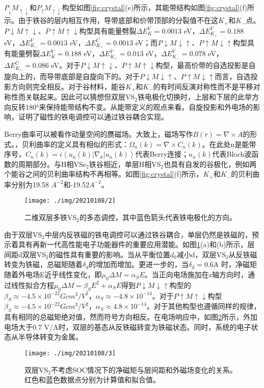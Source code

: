 \documentclass[reprint, aps, prb, showkeys]{revtex4-2}
\begin{document}
$P_{\downarrow}M_{\uparrow\downarrow}$和$P_{\uparrow}M_{\uparrow\downarrow}$构型如图\ref{fig:crystal}(e)所示，其能带结构如图\ref{fig:crystal}(f)所示。由于铁谷的层内相互作用，导带底部和价带顶部的分裂值不在这$K_{+}$和$K_{-}$点。$P{\downarrow}M{\uparrow\downarrow}$、$P{\uparrow}M{\uparrow\downarrow}$构型具有能量劈裂$\Delta E_{K}^{V} = 0.0013$ eV，$\Delta E_{K_{+}}^{V} = 0.188$ eV，$\Delta E_{K_{-}}^{V} = 0.0013$ eV，$\Delta E_{K_{+}}^{\overline{C} } = 0.0013$ eV；而$P{\downarrow}M{\downarrow\uparrow}$、$P{\uparrow}M{\downarrow\uparrow}$构型具有能量劈裂$\Delta E_{K}^{V} = 0.188$ eV，$\Delta E_{K_{+}}^{V} = 0.013$ eV，$\Delta E_{K_{-}}^{V} = 0.078$ eV，$\Delta E_{K_{+}}^{\overline{C} } = 0.086$ eV。对于$P{\downarrow}M{\uparrow\downarrow}$、$P{\uparrow}M{\uparrow\downarrow}$构型，最高价带的自选投影是自旋向上的，而导带底部是自旋向下的。对于$P{\downarrow}M{\downarrow\uparrow}$、$P{\uparrow}M{\downarrow\uparrow}$而言，自选投影方向则完全相反。对于谷材料，能谷$K_{+}$和$K_{-}$的有时间反演对称性而不是平移对称性而关联起来。因此可以猜想但双层VS$_2$铁电极化切换时，上层和下层的此举方向反转180°来保持能带结构不变。从能带定义的观点来看。自旋投影和外电场的影响，证明了磁性的铁电调控可以通过铁谷耦合实现。

Berry曲率可以被看作动量空间的赝磁场。大致上，磁场写作$B(r) = \nabla \times A$的形式。，贝利曲率的定义具有相似的形式：$\Omega_{n}(k) = \nabla \times C_n(k)$。在此处n是能带序号，$C_n(k) = i \left\langle u_n(k)| \nabla_k | u_n(k) \right\rangle $代表Berry连接；$u_n(k)$代表Bloch波函数的周期部分。与H相VSe$_2$铁谷相近，单层H相VS$_2$也具有自发的谷极化，例如两个能谷之间的贝利曲率结构不再相等。如图\ref{fig:crystal}(f)所示，$K_{+}$和$K_{-}$的贝利曲率分别为19.58 $A^{-2}$和-19.52$A^{-2}$。

\begin{figure}[t]
    \texttt{[image: ./img/20210108/2]}
    \caption{\label{fig:control} 
    二维双层多铁VS$_2$的多态调控，其中蓝色箭头代表铁电极化的方向。
    }
\end{figure}
由于双层VS$_2$中层内反铁磁的铁电调控可以通过铁谷耦合，单层仍然是铁磁的，预示着具有再新一代高性能电子功能器件的重要应用潜能。如图\ref{fig:control}(a)和(b)所示，层间距d双层VS$_2$的磁性具有重要的影响。当从平衡位置$d_0$减小d，双层VS$_2$从反铁磁转变为铁磁，总磁矩随着$\delta_d$的增加而增加。更进一步的，当$\delta_d = 0.6 $A 时，净磁矩随着外电场E近乎线性变化，即$\mu_0 \Delta M = \alpha_S E$。当正向电场施加在z轴方向时，通过线性拟合方程$\mu_0 \Delta M = \beta_S E^2 + \alpha_S E$得到$P{\downarrow}M{\downarrow\uparrow}$构型的$\beta_S \approx -4.5 \times 10^{-22} Gcm^3/V^2$，$\alpha_S \approx -4.8 \times 10^{-14}$。对于$P{\uparrow}M{\uparrow\downarrow}$构型$\beta_S \approx -4.5 \times 10^{-22} Gcm^3/V^2$，$\alpha_S \approx 4.8 \times 10^{-14}$。对于其他构型也遵循同样的规律，具有相同的总磁矩绝对值，然而符号方向相反。在电场响应中，如图\ref{fig:field}所示，外加电场大于0.7 V/A时，双层的基态从反铁磁转变为铁磁状态。同时，系统的电子状态从半导体转变为金属。
\begin{figure}[b]
    \texttt{[image: ./img/20210108/3]}
    \caption{\label{fig:field} 
    双层VS$_2$不考虑SOC情况下的净磁矩与层间距和外磁场变化的关系。红色和蓝色数据点分别为计算值和拟合值。
    }
\end{figure}
\end{document}

